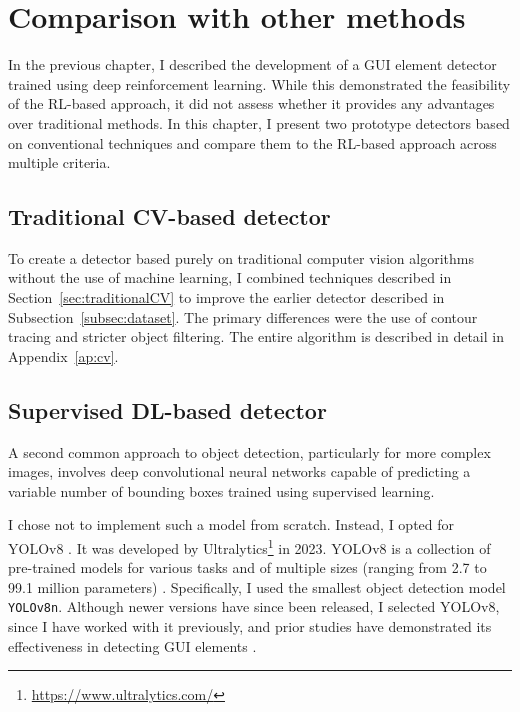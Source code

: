 \documentclass[
  digital,     %
  oneside,     %
  nosansbold,  %
  nocolorbold, %
  lof,         %
  lot,         %
]{fithesis4}
\begin{document}
\chapter{Comparison with other methods}
\label{ch:comparisons}

In the previous chapter, I described the development of a GUI element detector trained using deep reinforcement learning. While this demonstrated the feasibility of the RL-based approach, it did not assess whether it provides any advantages over traditional methods. In this chapter, I present two prototype detectors based on conventional techniques and compare them to the RL-based approach across multiple criteria.

\section{Traditional CV-based detector}
\label{sec:trad_cv_detector}

To create a detector based purely on traditional computer vision algorithms without the use of machine learning, I combined techniques described in Section~\ref{sec:traditionalCV} to improve the earlier detector described in Subsection~\ref{subsec:dataset}. The primary differences were the use of contour tracing and stricter object filtering. The entire algorithm is described in detail in Appendix~\ref{ap:cv}.

\section{Supervised DL-based detector}

A second common approach to object detection, particularly for more complex images, involves deep convolutional neural networks capable of predicting a variable number of bounding boxes trained using supervised learning.

I chose not to implement such a model from scratch. Instead, I opted for YOLOv8 \cite{yolov8_ultralytics}. It was developed by Ultralytics\footnote{\url{https://www.ultralytics.com/}} in 2023. YOLOv8 is a collection of pre-trained models for various tasks and of multiple sizes (ranging from 2.7 to 99.1 million parameters) \cite{ultralytics-docs}. Specifically, I used the smallest object detection model \texttt{YOLOv8n}. Although newer versions have since been released, I selected YOLOv8, since I have worked with it previously, and prior studies have demonstrated its effectiveness in detecting GUI elements \cite{GUI_YOLO_comparison}.
\end{document}
